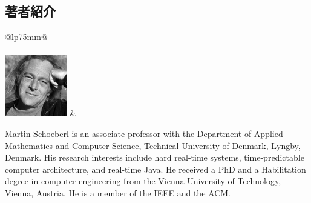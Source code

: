 
\thispagestyle{empty}


\hfill
\begin{minipage}{100mm}\begin{spacing}{1.0}

\subsection*{著者紹介}

\noindent
\begin{tabular}[t]{@{}lp{75mm}@{}}
  \\
  \\[-2mm]
  \includegraphics[height=27mm]{chisel-book-ja/Martin-BW.jpg}
  &
  \\
\end{tabular}

\ifshoworiginal
Martin Schoeberl is an associate professor with the Department of Applied Mathematics
and Computer Science, Technical University of Denmark, Lyngby, Denmark.
His research interests include hard real-time systems, time-predictable computer architecture,
and real-time Java. He received a PhD and a Habilitation degree in computer engineering
from the Vienna University of Technology, Vienna, Austria. 
He is a member of the IEEE and the ACM.
\fi

\bigskip


\end{spacing}
\end{minipage}
